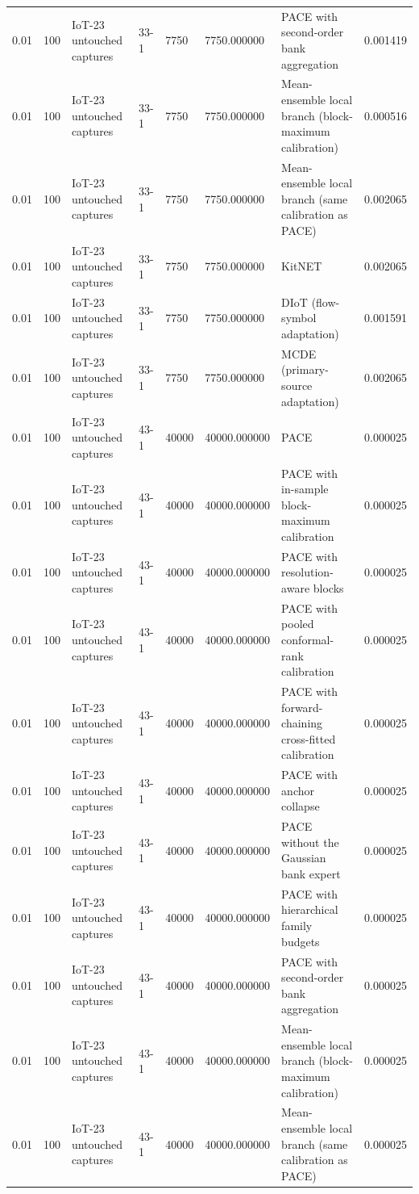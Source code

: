 \begin{tabular}{llllllll}
0.01 & 100 & IoT-23 untouched captures & 33-1 & 7750 & 7750.000000 & PACE with second-order bank aggregation & 0.001419 \\
0.01 & 100 & IoT-23 untouched captures & 33-1 & 7750 & 7750.000000 & Mean-ensemble local branch (block-maximum calibration) & 0.000516 \\
0.01 & 100 & IoT-23 untouched captures & 33-1 & 7750 & 7750.000000 & Mean-ensemble local branch (same calibration as PACE) & 0.002065 \\
0.01 & 100 & IoT-23 untouched captures & 33-1 & 7750 & 7750.000000 & KitNET & 0.002065 \\
0.01 & 100 & IoT-23 untouched captures & 33-1 & 7750 & 7750.000000 & DIoT (flow-symbol adaptation) & 0.001591 \\
0.01 & 100 & IoT-23 untouched captures & 33-1 & 7750 & 7750.000000 & MCDE (primary-source adaptation) & 0.002065 \\
0.01 & 100 & IoT-23 untouched captures & 43-1 & 40000 & 40000.000000 & PACE & 0.000025 \\
0.01 & 100 & IoT-23 untouched captures & 43-1 & 40000 & 40000.000000 & PACE with in-sample block-maximum calibration & 0.000025 \\
0.01 & 100 & IoT-23 untouched captures & 43-1 & 40000 & 40000.000000 & PACE with resolution-aware blocks & 0.000025 \\
0.01 & 100 & IoT-23 untouched captures & 43-1 & 40000 & 40000.000000 & PACE with pooled conformal-rank calibration & 0.000025 \\
0.01 & 100 & IoT-23 untouched captures & 43-1 & 40000 & 40000.000000 & PACE with forward-chaining cross-fitted calibration & 0.000025 \\
0.01 & 100 & IoT-23 untouched captures & 43-1 & 40000 & 40000.000000 & PACE with anchor collapse & 0.000025 \\
0.01 & 100 & IoT-23 untouched captures & 43-1 & 40000 & 40000.000000 & PACE without the Gaussian bank expert & 0.000025 \\
0.01 & 100 & IoT-23 untouched captures & 43-1 & 40000 & 40000.000000 & PACE with hierarchical family budgets & 0.000025 \\
0.01 & 100 & IoT-23 untouched captures & 43-1 & 40000 & 40000.000000 & PACE with second-order bank aggregation & 0.000025 \\
0.01 & 100 & IoT-23 untouched captures & 43-1 & 40000 & 40000.000000 & Mean-ensemble local branch (block-maximum calibration) & 0.000025 \\
0.01 & 100 & IoT-23 untouched captures & 43-1 & 40000 & 40000.000000 & Mean-ensemble local branch (same calibration as PACE) & 0.000025 \\

\end{tabular}
